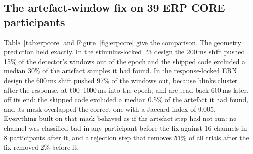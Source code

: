 \documentclass[11pt]{article}
\begin{document}
\subsection{The artefact-window fix on 39 ERP CORE participants}
\label{sec:erpcore}
Table~\ref{tab:erpcore} and Figure~\ref{fig:erpcore} give the comparison. The geometry prediction held exactly. In the stimulus-locked P3 design the 200\,ms shift pushed 15\% of the detector's windows out of the epoch and the shipped code excluded a median 30\% of the artefact samples it had found. In the response-locked ERN design the 600\,ms shift pushed 97\% of the windows out, because blinks cluster after the response, at 600--1000\,ms into the epoch, and are read back 600\,ms later, off its end; the shipped code excluded a median 0.5\% of the artefact it had found, and its mask overlapped the correct one with a Jaccard index of 0.005. Everything built on that mask behaved as if the artefact step had not run: no channel was classified bad in any participant before the fix against 16 channels in 8 participants after it, and a rejection step that removes 51\% of all trials after the fix removed 2\% before it.
\end{document}
